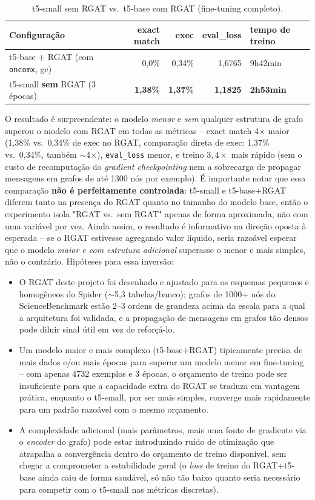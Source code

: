 \begin{table}[h]
\centering
\caption{t5-small sem RGAT vs.\ t5-base com RGAT (fine-tuning completo).}
\label{tab:t5small-vs-rgat}
\begin{tabular}{lrrrl}
\toprule
\textbf{Configuração} & \textbf{exact match} & \textbf{exec} & \textbf{eval\_loss} & \textbf{tempo de treino} \\
\midrule
t5-base + RGAT (com \texttt{oncomx}, gc) & 0,0\% & 0,34\% & 1,6765 & 9h42min \\
t5-small \textbf{sem} RGAT (3 épocas)     & \textbf{1,38\%} & \textbf{1,37\%} & \textbf{1,1825} & \textbf{2h53min} \\
\bottomrule
\end{tabular}
\end{table}

O resultado é surpreendente: o modelo \emph{menor} e \emph{sem} qualquer
estrutura de grafo superou o modelo com RGAT em todas as métricas -- exact
match 4$\times$ maior (1,38\% vs.\ 0,34\% de exec no RGAT, comparação
direta de exec: 1,37\% vs.\ 0,34\%, também $\sim$4$\times$), \texttt{eval\_loss}
menor, e treino $3{,}4\times$ mais rápido (sem o custo de recomputação do
\emph{gradient checkpointing} nem a sobrecarga de propagar mensagens em
grafos de até 1300 nós por exemplo). É importante notar que essa
comparação \textbf{não é perfeitamente controlada}: t5-small e t5-base+RGAT
diferem tanto na presença do RGAT quanto no tamanho do modelo base, então
o experimento isola "RGAT vs.\ sem RGAT" apenas de forma aproximada, não
com uma variável por vez. Ainda assim, o resultado é informativo na direção
oposta à esperada -- se o RGAT estivesse agregando valor líquido, seria
razoável esperar que o modelo \emph{maior e com estrutura adicional}
superasse o menor e mais simples, não o contrário. Hipóteses para essa
inversão:

\begin{itemize}
\item O RGAT deste projeto foi desenhado e ajustado para os esquemas
pequenos e homogêneos do Spider ($\sim$5,3 tabelas/banco); grafos de
1000+ nós do ScienceBenchmark estão 2--3 ordens de grandeza acima da escala
para a qual a arquitetura foi validada, e a propagação de mensagens em
grafos tão densos pode diluir sinal útil em vez de reforçá-lo.
\item Um modelo maior e mais complexo (t5-base+RGAT) tipicamente precisa de
mais dados e/ou mais épocas para superar um modelo menor em fine-tuning --
com apenas 4732 exemplos e 3 épocas, o orçamento de treino pode ser
insuficiente para que a capacidade extra do RGAT se traduza em vantagem
prática, enquanto o t5-small, por ser mais simples, converge mais
rapidamente para um padrão razoável com o mesmo orçamento.
\item A complexidade adicional (mais parâmetros, mais uma fonte de
gradiente via o \emph{encoder} do grafo) pode estar introduzindo ruído de
otimização que atrapalha a convergência dentro do orçamento de treino
disponível, sem chegar a comprometer a estabilidade geral (o \emph{loss}
de treino do RGAT+t5-base ainda caiu de forma saudável, só não tão baixo
quanto seria necessário para competir com o t5-small nas métricas
discretas).
\end{itemize}

